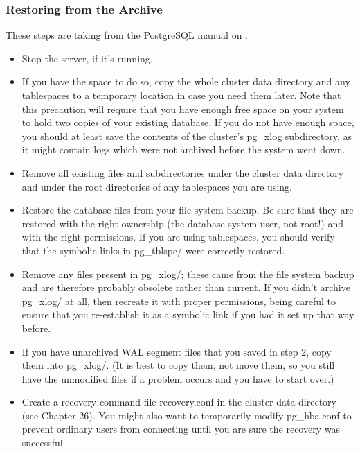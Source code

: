 \documentclass[a4paper,11pt,english]{sphinxmanual}
\begin{document}
\subsubsection{Restoring from the Archive}
\label{\detokenize{maintenance:restoring-from-the-archive}}
These steps are taking from the PostgreSQL manual on .
\begin{itemize}
\item {} 
Stop the server, if it’s running.

\item {} 
If you have the space to do so, copy the whole cluster data directory and any tablespaces to a temporary location in case you need them later. Note that this precaution will require that you have enough free space on your system to hold two copies of your existing database. If you do not have enough space, you should at least save the contents of the cluster’s pg\_xlog subdirectory, as it might contain logs which were not archived before the system went down.

\item {} 
Remove all existing files and subdirectories under the cluster data directory and under the root directories of any tablespaces you are using.

\item {} 
Restore the database files from your file system backup. Be sure that they are restored with the right ownership (the database system user, not root!) and with the right permissions. If you are using tablespaces, you should verify that the symbolic links in pg\_tblspc/ were correctly restored.

\item {} 
Remove any files present in pg\_xlog/; these came from the file system backup and are therefore probably obsolete rather than current. If you didn’t archive pg\_xlog/ at all, then recreate it with proper permissions, being careful to ensure that you re-establish it as a symbolic link if you had it set up that way before.

\item {} 
If you have unarchived WAL segment files that you saved in step 2, copy them into pg\_xlog/. (It is best to copy them, not move them, so you still have the unmodified files if a problem occurs and you have to start over.)

\item {} 
Create a recovery command file recovery.conf in the cluster data directory (see Chapter 26). You might also want to temporarily modify pg\_hba.conf to prevent ordinary users from connecting until you are sure the recovery was successful.


\end{itemize}
\end{document}
